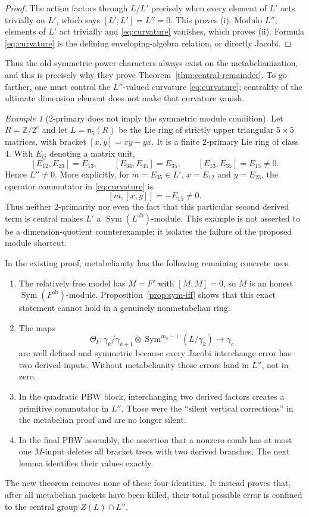 \documentclass[a4paper,11pt,reqno]{amsart}
\theoremstyle{definition}
\theoremstyle{remark}
\newtheorem{example}[theorem]{Example}
\newcommand{\Z}{\mathbb Z}
\newcommand{\gm}{\gamma}
\newcommand{\Sym}{\operatorname{Sym}}
\newcommand{\ab}{\mathrm{ab}}
\begin{document}
\begin{proof}
The action factors through $L/L'$ precisely when every element of $L'$ acts
trivially on $L'$, which says $[L',L']=L''=0$.  This proves (i).  Modulo
$L''$, elements of $L'$ act trivially and \eqref{eq:curvature} vanishes, which
proves (ii).  Formula \eqref{eq:curvature} is the defining enveloping-algebra
relation, or directly Jacobi.
\end{proof}

Thus the old symmetric-power characters always exist on the
metabelianization, and this is precisely why they prove
Theorem~\ref{thm:central-remainder}.  To go farther, one must control the
$L''$-valued curvature \eqref{eq:curvature}; centrality of the ultimate
dimension element does not make that curvature vanish.

\begin{example}[$2$-primary does not imply the symmetric module condition]
\label{ex:ut5}
Let $R=\Z/2^e$ and let $L=\mathfrak n_5(R)$ be the Lie ring of strictly upper
triangular $5\times5$ matrices, with bracket $[x,y]=xy-yx$.  It is a finite
$2$-primary Lie ring of class $4$.  With $E_{ij}$ denoting a matrix unit,
\[
 [E_{12},E_{23}]=E_{13},\qquad
 [E_{34},E_{45}]=E_{35},\qquad
 [E_{13},E_{35}]=E_{15}\ne0.
\]
Hence $L''\ne0$.  More explicitly, for
$m=E_{35}\in L'$, $x=E_{12}$ and $y=E_{23}$, the operator commutator in
\eqref{eq:curvature} is
\[
                         [m,[x,y]]=-E_{15}\ne0.
\]
Thus neither $2$-primarity nor even the fact that this particular second
derived term is central makes $L'$ a $\Sym(L^{\ab})$-module.  This example is
not asserted to be a dimension-quotient counterexample; it isolates the
failure of the proposed module shortcut.
\end{example}

In the existing proof, metabelianity has the following remaining concrete
uses.
\begin{enumerate}
\item The relatively free model has $M=F'$ with $[M,M]=0$, so $M$ is an
honest $\Sym(F^{\ab})$-module.  Proposition~\ref{prop:sym-iff} shows that this
exact statement cannot hold in a genuinely nonmetabelian ring.
\item The maps
\[
 \Theta_k:\gm_k/\gm_{k+1}\otimes
       \Sym^{m_k-1}(L/\gm_k)\longrightarrow\gm_c
\]
are well defined and symmetric because every Jacobi interchange error has
two derived inputs.  Without metabelianity those errors land in $L''$, not
in zero.
\item In the quadratic PBW block, interchanging two derived factors creates
a primitive commutator in $L''$.  Those were the ``silent vertical
corrections'' in the metabelian proof and are no longer silent.
\item In the final PBW assembly, the assertion that a nonzero comb has at
most one $M$-input deletes all bracket trees with two derived branches.  The
next lemma identifies their values exactly.
\end{enumerate}
The new theorem removes none of these four identities.  It instead proves
that, after all metabelian packets have been killed, their total possible
error is confined to the central group $Z(L)\cap L''$.
\end{document}

